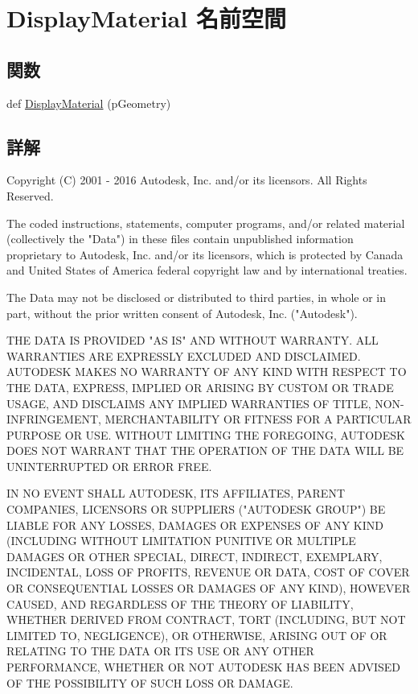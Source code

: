 \hypertarget{namespace_display_material}{}\section{Display\+Material 名前空間}
\label{namespace_display_material}
\subsection*{関数}
\begin{DoxyCompactItemize}
\item 
def \hyperlink{namespace_display_material_afd52930c7a7f86c1fb22b7816ddc28f7}{Display\+Material} (p\+Geometry)
\end{DoxyCompactItemize}


\subsection{詳解}
\begin{DoxyVerb} Copyright (C) 2001 - 2016 Autodesk, Inc. and/or its licensors.
 All Rights Reserved.

 The coded instructions, statements, computer programs, and/or related material 
 (collectively the "Data") in these files contain unpublished information 
 proprietary to Autodesk, Inc. and/or its licensors, which is protected by 
 Canada and United States of America federal copyright law and by international 
 treaties. 
 
 The Data may not be disclosed or distributed to third parties, in whole or in
 part, without the prior written consent of Autodesk, Inc. ("Autodesk").

 THE DATA IS PROVIDED "AS IS" AND WITHOUT WARRANTY.
 ALL WARRANTIES ARE EXPRESSLY EXCLUDED AND DISCLAIMED. AUTODESK MAKES NO
 WARRANTY OF ANY KIND WITH RESPECT TO THE DATA, EXPRESS, IMPLIED OR ARISING
 BY CUSTOM OR TRADE USAGE, AND DISCLAIMS ANY IMPLIED WARRANTIES OF TITLE, 
 NON-INFRINGEMENT, MERCHANTABILITY OR FITNESS FOR A PARTICULAR PURPOSE OR USE. 
 WITHOUT LIMITING THE FOREGOING, AUTODESK DOES NOT WARRANT THAT THE OPERATION
 OF THE DATA WILL BE UNINTERRUPTED OR ERROR FREE. 
 
 IN NO EVENT SHALL AUTODESK, ITS AFFILIATES, PARENT COMPANIES, LICENSORS
 OR SUPPLIERS ("AUTODESK GROUP") BE LIABLE FOR ANY LOSSES, DAMAGES OR EXPENSES
 OF ANY KIND (INCLUDING WITHOUT LIMITATION PUNITIVE OR MULTIPLE DAMAGES OR OTHER
 SPECIAL, DIRECT, INDIRECT, EXEMPLARY, INCIDENTAL, LOSS OF PROFITS, REVENUE
 OR DATA, COST OF COVER OR CONSEQUENTIAL LOSSES OR DAMAGES OF ANY KIND),
 HOWEVER CAUSED, AND REGARDLESS OF THE THEORY OF LIABILITY, WHETHER DERIVED
 FROM CONTRACT, TORT (INCLUDING, BUT NOT LIMITED TO, NEGLIGENCE), OR OTHERWISE,
 ARISING OUT OF OR RELATING TO THE DATA OR ITS USE OR ANY OTHER PERFORMANCE,
 WHETHER OR NOT AUTODESK HAS BEEN ADVISED OF THE POSSIBILITY OF SUCH LOSS
 OR DAMAGE. \end{DoxyVerb}
 

